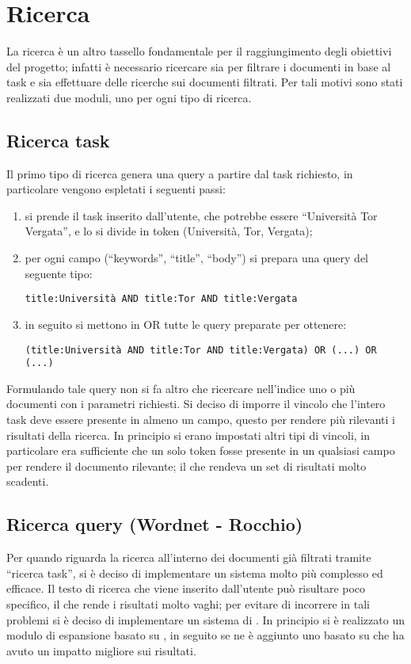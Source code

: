 \section{Ricerca}\label{cap:retrival:searcher}
La ricerca è un altro tassello fondamentale per il raggiungimento degli obiettivi del progetto; infatti è necessario ricercare sia per filtrare i documenti in base al task e sia effettuare delle ricerche sui documenti filtrati. Per tali motivi sono stati realizzati due moduli, uno per ogni tipo di ricerca.
\subsection{Ricerca task}
Il primo tipo di ricerca genera una query a partire dal task richiesto, in particolare vengono espletati i seguenti passi:
\begin{enumerate}
\item si prende il task inserito dall'utente, che potrebbe essere ``Università Tor Vergata'', e lo si divide in token (Università, Tor, Vergata);
\item per ogni campo (``keywords'', ``title'', ``body'') si prepara una query del seguente tipo:
\begin{center}
\texttt{title:Università AND title:Tor AND title:Vergata}
\end{center}
\item in seguito si mettono in OR tutte le query preparate per ottenere:
\begin{center}
\texttt{(title:Università AND title:Tor AND title:Vergata) OR (...) OR (...)}
\end{center}
\end{enumerate}
Formulando tale query non si fa altro che ricercare nell'indice uno o più documenti con i parametri richiesti. Si deciso di imporre il vincolo che l'intero task deve essere presente in almeno un campo, questo per rendere più rilevanti i risultati della ricerca. In principio si erano impostati altri tipi di vincoli, in particolare era sufficiente che un solo token fosse presente in un qualsiasi campo per rendere il documento rilevante; il che rendeva un set di risultati molto scadenti.
\subsection{Ricerca query (Wordnet - Rocchio)}
Per quando riguarda la ricerca all'interno dei documenti già filtrati tramite ``ricerca task'', si è deciso di implementare un sistema molto più complesso ed efficace. Il testo di ricerca che viene inserito dall'utente può risultare poco specifico, il che rende i risultati molto vaghi; per evitare di incorrere in tali problemi si è deciso di implementare un sistema di . In principio si è realizzato un modulo di espansione basato su , in seguito se ne è aggiunto uno basato su  che ha avuto un impatto migliore sui risultati.
